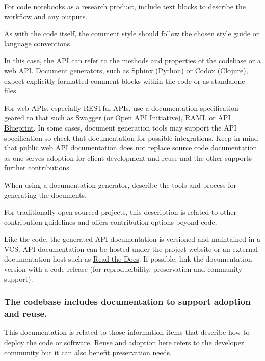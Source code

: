 \documentclass{article}
\newcounter{subsubsubsection}[subsubsection]
\begin{document}
For code notebooks as a research product, include text blocks to describe the workflow and any outputs. 

As with the code itself, the comment style should follow the chosen style guide or language conventions. 

In this case, the API can refer to the methods and properties of the codebase or a web API. Document generators, such as \href{http://www.sphinx-doc.org/en/stable/index.html} {Sphinx} (Python) or \href{https://github.com/weavejester/codox} {Codox} (Clojure), expect explicitly formatted comment blocks within the code or as standalone files. 
 
For web APIs, especially RESTful APIs, use a documentation specification geared to that such as \href{http://swagger.io/} {Swagger} (or \href{https://openapis.org/} {Open API Initiative}), \href{http://raml.org/} {RAML} or \href{https://apiblueprint.org/} {API Blueprint}. In some cases, document generation tools may support the API specification so check that documentation for possible integrations. Keep in mind that public web API documentation does not replace source code documentation as one serves adoption for client development and reuse and the other supports further contributions. 

When using a documentation generator, describe the tools and process for generating the documents. 

For traditionally open sourced projects, this description is related to other contribution guidelines and offers contribution options beyond code.

Like the code, the generated API documentation is versioned and maintained in a VCS. API documentation can be hosted under the project website or an external documentation host such as \href{https://readthedocs.org/} {Read the Docs}. If possible, link the documentation version with a code release (for reproducibility, preservation and community support). 

\subsubsection{The codebase includes documentation to support adoption and reuse.}
This documentation is related to those information items that describe how to deploy the code or software. Reuse and adoption here refers to the developer community but it can also benefit preservation needs. 
\end{document}
